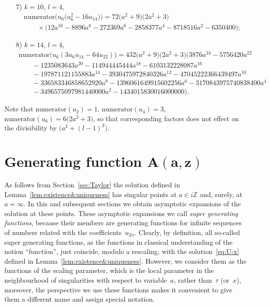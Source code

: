 \documentclass[pdftex]{sigma}
\numberwithin{equation}{section}
\begin{document}
\begin{enumerate}
\item[7)] $k=10$, $l=4$,
\begin{gather*}
\mathrm{numerator}\big(u_6\big(u_6^2-16u_{14}\big)\big)=72\big(a^2+9\big)\big(2a^2+3\big) \\
\qquad{}\times \big(12a^{10}-8896a^8-272369a^6-2858377a^4-8718516a^2-6350400\big);
\end{gather*}
\item[8)] $k=14$, $l=4$,
\begin{gather*}
\mathrm{numerator}\big(u_6(3u_6u_{14}-64u_{22})\big)=432\big(a^2+9\big)\big(2a^2+3\big) \big(3876a^{24}-5756420a^{22}\\
\qquad{} -1235083643a^{20}-114944445444a^{18}-6103132228087a^{16}\\
\qquad{}- 197871121155883a^{14}-3930475972840326a^{12}-47045222366439497a^{10}\\
\qquad{}- 336583346858652920a^8-1396061649915602256a^6-3170843975740838400a^4\\
\qquad{}- 3496575097981440000a^2-1434015830016000000\big).
\end{gather*}
\end{enumerate}
\begin{Remark}
Note that $\mathrm{numerator}(u_2)=1$, $\mathrm{numerator}(u_4)=3$, $\mathrm{numerator}(u_6)=6\big(2a^2+3\big)$, so that corresponding factors does not effect on the divisibility by $\big(a^2+(l-1)^2\big)$.
\end{Remark}

\section[Generating function $A(a,z)$]{Generating function $\boldsymbol{A(a,z)}$}\label{sec:generating-A}

As follows from Section~\ref{sec:Taylor} the solution defined in Lemma~\ref{lem:existence&uniqueness} has
singular points at $a\in i\mathbb{Z}$ and, surely, at $a=\infty$. In this and subsequent sections we obtain
asymptotic expansions of the solution at these points. These asymptotic expansions we call
{\it super generating functions}, because their members are generating functions for infinite sequences of numbers
related with the coefficients~$u_{2n}$. Clearly, by definition, all so-called super generating functions, as the
functions in classical understanding of the notion ``function'', just coincide, modulo a rescaling, with
the solution~\eqref{eq:U-x} defined in Lemma~\ref{lem:existence&uniqueness}. However, we consider them as the
functions of the scaling parameter, which is the local parameter in the neighbourhood of singularities with respect
to variable~$a$, rather than~$\tau$ (or~$x$), moreover, the perspective we use these functions makes it convenient
to give them a different name and assign special notation.
\end{document}
